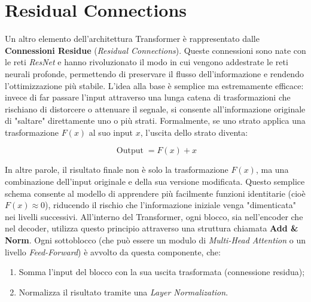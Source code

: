 \section{Residual Connections}

Un altro elemento dell’architettura Transformer è rappresentato dalle \textbf{Connessioni Residue} (\textit{Residual Connections}). Queste connessioni sono nate con le reti \textit{ResNet} e hanno rivoluzionato il modo in cui vengono addestrate le reti neurali profonde, permettendo di preservare il flusso dell’informazione e rendendo l’ottimizzazione più stabile. L’idea alla base è semplice ma estremamente efficace: invece di far passare l’input attraverso una lunga catena di trasformazioni che rischiano di distorcere o attenuare il segnale, si consente all’informazione originale di "saltare" direttamente uno o più strati. Formalmente, se uno strato applica una trasformazione $F(x)$ al suo input $x$, l’uscita dello strato diventa:

\begin{equation}
    \operatorname{Output} = F(x) + x
\end{equation}

In altre parole, il risultato finale non è solo la trasformazione $F(x)$, ma una combinazione dell’input originale e della sua versione modificata. Questo semplice schema consente al modello di apprendere più facilmente funzioni identitarie (cioè $F(x) \approx 0$), riducendo il rischio che l’informazione iniziale venga "dimenticata" nei livelli successivi. All’interno del Transformer, ogni blocco, sia nell’encoder che nel decoder, utilizza questo principio attraverso una struttura chiamata \textbf{Add \& Norm}.  
Ogni sottoblocco (che può essere un modulo di \textit{Multi-Head Attention} o un livello \textit{Feed-Forward}) è avvolto da questa componente, che:
\begin{enumerate}
    \item Somma l’input del blocco con la sua uscita trasformata (connessione residua);
    \item Normalizza il risultato tramite una \textit{Layer Normalization}.
\end{enumerate}

